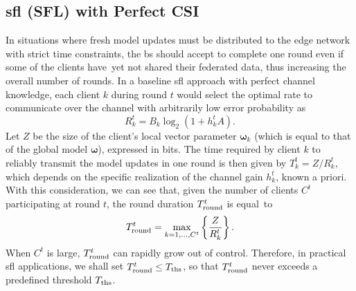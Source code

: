 \documentclass[10pt, conference, letterpaper]{IEEEtran}
\begin{document}
	
	\subsection{\Acrlong{sfl} (SFL) with Perfect CSI} 
	\label{ssec:perfect}
	In situations where fresh model updates must be distributed to the edge network with strict time constraints, the \gls{bs} should accept to complete one round even if some of the clients have yet not shared their federated data, thus increasing the overall number of rounds. 
	In a baseline \gls{sfl} approach with perfect channel knowledge, each client $k$ during round $t$ would select the optimal rate to communicate over the channel with arbitrarily low error probability as
	\begin{equation}
		R_k^t = B_k \log_2(1 + h_k^t A).
		\label{eq:r}	
	\end{equation}
	Let $Z$ be the size of the client's local vector parameter $\bm{\omega}_k$ (which is  equal to that of the global model $\bm{\omega}$), expressed in bits.
	The time required by client $k$ to reliably transmit the model updates in one round is then given by ${T_k^t = Z/R_k^t}$, which depends on the specific realization of the channel gain $h_k^t$, known a priori. With this consideration, we can see that, given the number of clients $C^t$ participating at round $t$, the round duration $T_{\rm round}^t$ is equal~to
	\begin{equation}
		T_{\rm round}^t = \max_{k =1, \dots, C^t} \left\{ \frac{Z}{R_k^t} \right\}. %
	\end{equation}
	When $C^t$ is large, $T_{\rm round}^t$ can rapidly grow out of control. Therefore, in practical \gls{sfl} applications, we shall set $T_{\rm round}^t \leq T_{\rm ths}$, so that $T_{\rm round}^t$ never exceeds a predefined threshold $T_{\rm ths}$.
	
\end{document}
